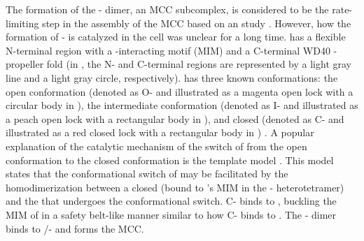 The formation of the - dimer, an MCC subcomplex, is considered to be the rate-limiting step in the assembly of the MCC based on an  study \cite{Faesen2017}. However, how the formation of - is catalyzed in the cell was unclear for a long time.  has a flexible N-terminal region with a -interacting motif (MIM) and a C-terminal WD40 \textbeta{}-propeller fold \cite{CDC20-KEN} (in , the N- and C-terminal regions are represented by a light gray line and a light gray circle, respectively).  has three known conformations: the open conformation (denoted as O- and illustrated as a magenta open lock with a circular body in ), the intermediate conformation (denoted as I- and illustrated as a peach open lock with a rectangular body in ), and closed (denoted as C- and illustrated as a red closed lock with a rectangular body in ) \cite{I-MAD2}. A popular explanation of the catalytic mechanism of the switch of  from the open conformation to the closed conformation is the template model \cite{TemplateModel}. This model states that the conformational switch of  may be facilitated by the homodimerization between a closed  (bound to 's MIM in the - heterotetramer) and the  that undergoes the conformational switch. C- binds to , buckling the MIM of  in a safety belt-like manner similar to how C- binds to  \cite{Structure1GO4, SpMCC}. The - dimer binds to /- and forms the MCC.

